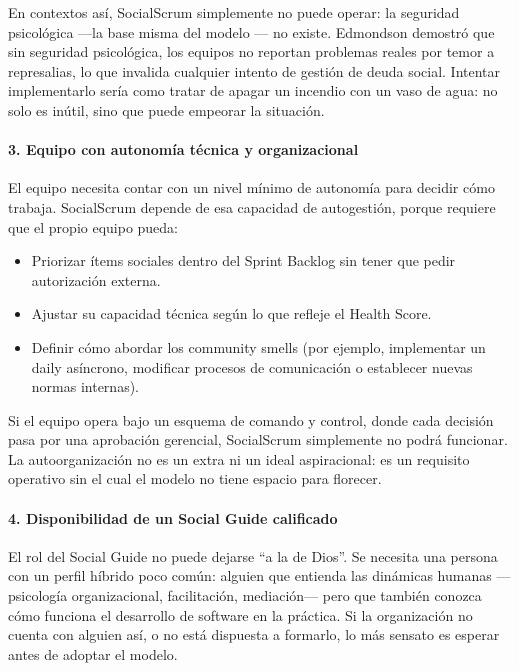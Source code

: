 En contextos así, SocialScrum simplemente no puede operar: la seguridad psicológica ---la base misma del modelo \cite{edmondson1999psychological}--- no existe. Edmondson demostró que sin seguridad psicológica, los equipos no reportan problemas reales por temor a represalias, lo que invalida cualquier intento de gestión de deuda social. Intentar implementarlo sería como tratar de apagar un incendio con un vaso de agua: no solo es inútil, sino que puede empeorar la situación.

\paragraph{3. Equipo con autonomía técnica y organizacional}

El equipo necesita contar con un nivel mínimo de autonomía para decidir cómo trabaja. SocialScrum depende de esa capacidad de autogestión, porque requiere que el propio equipo pueda:

\begin{itemize}
    \item Priorizar ítems sociales dentro del Sprint Backlog sin tener que pedir autorización externa.
    \item Ajustar su capacidad técnica según lo que refleje el Health Score.
    \item Definir cómo abordar los community smells (por ejemplo, implementar un daily asíncrono, modificar procesos de comunicación o establecer nuevas normas internas).
\end{itemize}

Si el equipo opera bajo un esquema de comando y control, donde cada decisión pasa por una aprobación gerencial, SocialScrum simplemente no podrá funcionar. La autoorganización no es un extra ni un ideal aspiracional: es un requisito operativo sin el cual el modelo no tiene espacio para florecer.

\paragraph{4. Disponibilidad de un Social Guide calificado}

El rol del Social Guide no puede dejarse ``a la de Dios''. Se necesita una persona con un perfil híbrido poco común: alguien que entienda las dinámicas humanas —psicología organizacional, facilitación, mediación— pero que también conozca cómo funciona el desarrollo de software en la práctica. Si la organización no cuenta con alguien así, o no está dispuesta a formarlo, lo más sensato es esperar antes de adoptar el modelo.

